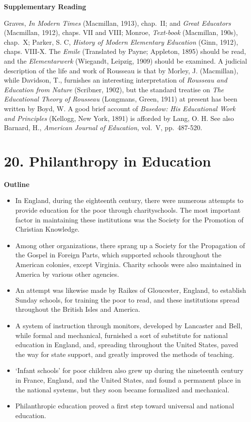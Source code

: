 \documentclass[
]{book}
\providecommand{\tightlist}{%
  \setlength{\itemsep}{0pt}\setlength{\parskip}{0pt}}
\begin{document}
\textbf{Supplementary Reading}

Graves, \emph{In Modern Times} (Macmillan, 1913), chap.~II; and \emph{Great Educators} (Macmillan, 1912), chaps. VII and VIII; Monroe, \emph{Text-book} (Macmillan, 190s), chap.~X; Parker, S. C, \emph{History of Modern Elementary Education} (Ginn, 1912), chaps. VIII-X. The \emph{Emile} (Translated by Payne; Appleton, 1895) should be read, and the \emph{Elementarwerk} (Wiegandt, Leipzig, 1909) should be examined. A judicial description of the life and work of Rousseau is that by Morley, J. (Macmillan), while Davidson, T., furnishes an interesting interpretation of \emph{Rousseau and Education from Nature} (Scribner, 1902), but the standard treatise on \emph{The Educational Theory of Rousseau} (Longmans, Green, 1911) at present has been written by Boyd, W. A good brief account of \emph{Basedow: His Educational Work and Principles} (Kellogg, New York, 1891) is afforded by Lang, O. H. See also Barnard, H., \emph{American Journal of Education,} vol.~V, pp.~487-520.

\hypertarget{philanthropy-in-education}{%
\chapter{20. Philanthropy in Education}\label{philanthropy-in-education}}

\textbf{Outline}

\begin{itemize}
\tightlist
\item
  In England, during the eighteenth century, there were numerous attempts to provide education for the poor through charityschools. The most important factor in maintaining these institutions was the Society for the Promotion of Christian Knowledge.
\item
  Among other organizations, there sprang up a Society for the Propagation of the Gospel in Foreign Parts, which supported schools throughout the American colonies, except Virginia. Charity schools were also maintained in America by various other agencies.
\item
  An attempt was likewise made by Raikes of Gloucester, England, to establish Sunday schools, for training the poor to read, and these institutions spread throughout the British Isles and America.
\item
  A system of instruction through monitors, developed by Lancaster and Bell, while formal and mechanical, furnished a sort of substitute for national education in England, and, spreading throughout the United States, paved the way for state support, and greatly improved the methods of teaching.
\item
  `Infant schools' for poor children also grew up during the nineteenth century in France, England, and the United States, and found a permanent place in the national systems, but they soon became formalized and mechanical.
\item
  Philanthropic education proved a first step toward universal and national education.
\end{itemize}
\end{document}
